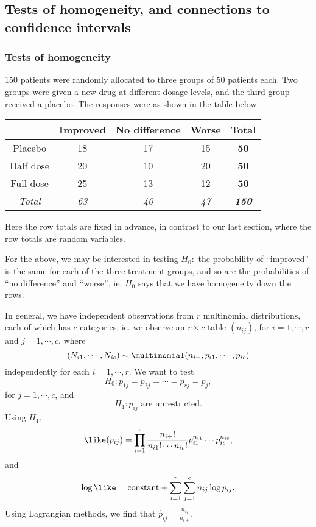 \documentclass[a4paper]{article}
\begin{document}
\subsection{Tests of homogeneity, and connections to confidence intervals}
\subsubsection{Tests of homogeneity}
\begin{eg}
  150 patients were randomly allocated to three groups of 50 patients each. Two groups were given a new drug at different dosage levels, and the third group received a placebo. The responses were as shown in the table below.
  \begin{center}
    \begin{tabular}{ccccc}
      \toprule
      & Improved & No difference & Worse & \textbf{Total}\\\midrule
      Placebo & 18 & 17 & 15 & \textbf{50}\\
      Half dose & 20 & 10 & 20 & \textbf{50}\\
      Full dose & 25 & 13 & 12& \textbf{50}\\\midrule
      \textit{Total} & \textit{63} & \textit{40} & \textit{47} & \textbf{\textit{150}}\\\bottomrule
    \end{tabular}
  \end{center}
  Here the row totals are fixed in advance, in contrast to our last section, where the row totals are random variables.

  For the above, we may be interested in testing $H_0:$ the probability of ``improved'' is the same for each of the three treatment groups, and so are the probabilities of ``no difference'' and ``worse'', ie. $H_0$ says that we have homogeneity down the rows.
\end{eg}
In general, we have independent observations from $r$ multinomial distributions, each of which has $c$ categories, ie. we observe an $r\times c$ table $(n_{ij})$, for $i = 1, \cdots, r$ and $j = 1, \cdots, c$, where
\[
  (N_{i1}, \cdots, N_{ic}) \sim \multinomial(n_{i+}, p_{i1}, \cdots, p_{ic})
\]
independently for each $i = 1, \cdots, r$.
We want to test
\[
  H_0: p_{1j} = p_{2j} = \cdots = p_{rj} = p_j,
\]
for $j = 1, \cdots, c$,  and
\[
  H_1: p_{ij}\text{ are unrestricted}.
\]
Using $H_1$,
\[
  \like(p_{ij}) = \prod_{i = 1}^r \frac{n_{i+}!}{n_{i1}!\cdots n_{ic}!}p_{i1}^{n_{i1}} \cdots p_{ic}^{n_{ic}},
\]
and
\[
  \log\like = \text{constant} + \sum_{i = 1}^r \sum_{j = 1}^c n_{ij}\log p_{ij}.
\]
Using Lagrangian methods, we find that $\hat{p}_{ij} = \frac{n_{ij}}{n_{i+}}$.
\end{document}
